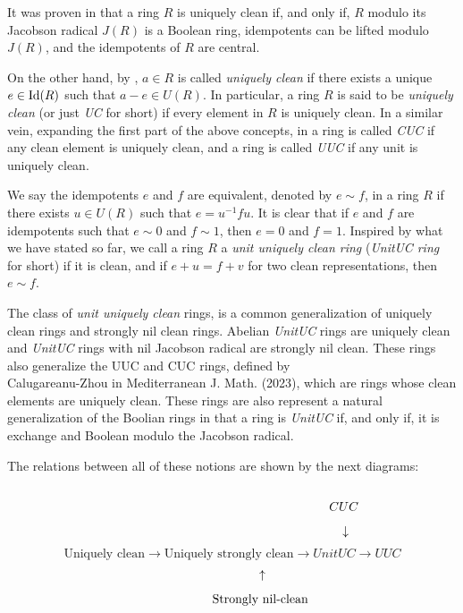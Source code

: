 \documentclass[12pt]{amsart}
\theoremstyle{definition}
\begin{document}
It was proven in \cite{NZ} that a ring $R$ is uniquely clean if, and only if, $R$ modulo its Jacobson radical $J(R)$ is a Boolean ring, idempotents can be lifted modulo $J(R)$, and the idempotents of $R$ are central.


On the other hand, by \cite{nicolson}, $a\in R$ is called {\it uniquely clean} if there exists a unique $e \in {\rm Id}(R)$ such that $a-e \in U(R)$. In particular, a ring $R$ is said to be {\it uniquely clean} (or just {\it UC} for short) if every element in $R$ is uniquely clean.
In a similar vein, expanding the first part of the above concepts, in \cite{zhou1} a ring is called {\it CUC} if any clean element is uniquely clean, and a ring is called {\it UUC} if any unit is uniquely clean.\par

 We say  the idempotents $e$ and $f$ are equivalent, denoted by $e \sim f$, in a ring $R$ if there exists $u \in U(R)$ such that $e = u^{-1}fu$. It is clear that if $e$ and $f$ are idempotents such that $e \sim 0$ and $f \sim 1$, then $e=0$ and $f=1$. Inspired by what we have stated so far, we call a ring $R$ a {\it unit uniquely clean ring} ({\it UnitUC ring} for short)   if it is clean, and if $e + u = f + v$ for two clean representations, then $e \sim f$.\par

The class of {\it unit uniquely clean} rings,  is a  common generalization of  uniquely clean rings and strongly nil clean rings. Abelian {\it UnitUC} rings are uniquely clean and {\it UnitUC} rings with nil Jacobson radical are strongly nil clean. These rings also generalize the UUC and CUC rings, defined by \\
Calugareanu-Zhou in Mediterranean J. Math. (2023), which are rings whose clean elements are uniquely clean. These rings are also represent a natural generalization of the Boolian rings in that a ring is {\it UnitUC} if, and only if, it is exchange and Boolean modulo the Jacobson radical. 
 
The relations between all of these notions are shown by the next diagrams:\\\\
 $$\indent\indent\indent\indent\indent\indent\indent\indent\indent\indent\indent\indent   CUC$$
 $$ \indent\indent\indent\indent\indent\indent\indent\indent\indent\indent\indent\indent   \downarrow$$
 $$\text{Uniquely clean}\longrightarrow \text{Uniquely strongly clean}\longrightarrow UnitUC\longrightarrow UUC$$ $$ \indent\indent\indent \uparrow$$
        $$ \indent\indent\indent \text{Strongly nil-clean}$$\\
 
\end{document}
